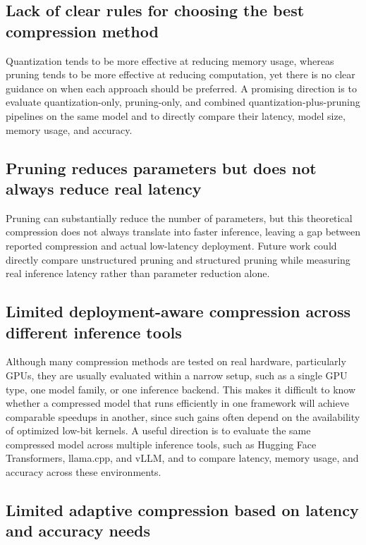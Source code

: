 \documentclass[
11pt, %
english, %
singlespacing, %
headsepline, %
]{MastersDoctoralThesis} %
\begin{document}
\subsection{Lack of clear rules for choosing the best compression method}

Quantization tends to be more effective at reducing memory usage, whereas pruning tends to be more effective at reducing computation, yet there is no clear guidance on when each approach should be preferred. A promising direction is to evaluate quantization-only, pruning-only, and combined quantization-plus-pruning pipelines \cite{xu2026daypq} on the same model and to directly compare their latency, model size, memory usage, and accuracy.

\subsection{Pruning reduces parameters but does not always reduce real latency}

Pruning can substantially reduce the number of parameters, but this theoretical compression does not always translate into faster inference, leaving a gap between reported compression and actual low-latency deployment. Future work could directly compare unstructured pruning \cite{frantar2023sparsegpt,sun2024wanda} and structured pruning \cite{ashkboos2024slicegpt,men2024shortgpt} while measuring real inference latency rather than parameter reduction alone.

\subsection{Limited deployment-aware compression across different inference tools}

Although many compression methods are tested on real hardware, particularly GPUs, they are usually evaluated within a narrow setup, such as a single GPU type, one model family, or one inference backend. This makes it difficult to know whether a compressed model that runs efficiently in one framework will achieve comparable speedups in another, since such gains often depend on the availability of optimized low-bit kernels. A useful direction is to evaluate the same compressed model across multiple inference tools, such as Hugging Face Transformers, llama.cpp, and vLLM, and to compare latency, memory usage, and accuracy across these environments.

\subsection{Limited adaptive compression based on latency and accuracy needs}
\end{document}
